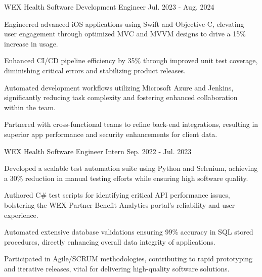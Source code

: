 


\begin{cventries}

  \cventry
    {WEX Health} %
    {Software Development Engineer} %
    {} %
    {Jul. 2023 - Aug. 2024} %
    {
      \begin{cvitems} %
      \item {Engineered advanced iOS applications using Swift and Objective-C, elevating user engagement through optimized MVC and MVVM designs to drive a 15\% increase in usage.}
    \item {Enhanced CI/CD pipeline efficiency by 35\% through improved unit test coverage, diminishing critical errors and stabilizing product releases.}
    \item {Automated development workflows utilizing Microsoft Azure and Jenkins, significantly reducing task complexity and fostering enhanced collaboration within the team.}
    \item {Partnered with cross-functional teams to refine back-end integrations, resulting in superior app performance and security enhancements for client data.}
      \end{cvitems}
    }

  \cventry
    {WEX Health} %
    {Software Engineer Intern} %
    {} %
    {Sep. 2022 - Jul. 2023} %
    {
      \begin{cvitems} %
      \item {Developed a scalable test automation suite using Python and Selenium, achieving a 30\% reduction in manual testing efforts while ensuring high software quality.}
    \item {Authored C\# test scripts for identifying critical API performance issues, bolstering the WEX Partner Benefit Analytics portal's reliability and user experience.}
    \item {Automated extensive database validations ensuring 99\% accuracy in SQL stored procedures, directly enhancing overall data integrity of applications.}
    \item {Participated in Agile/SCRUM methodologies, contributing to rapid prototyping and iterative releases, vital for delivering high-quality software solutions.}
      \end{cvitems}
    }


\end{cventries}
